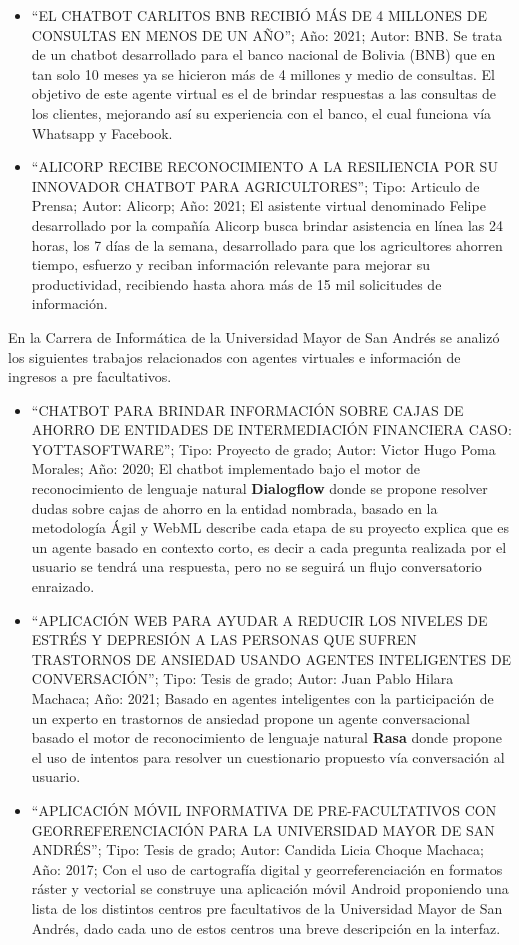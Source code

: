 \documentclass[letter, openright, 12pt]{book}
\begin{document}
\begin{itemize}
\item “EL CHATBOT CARLITOS BNB RECIBIÓ MÁS DE 4 MILLONES DE CONSULTAS EN MENOS DE UN AÑO”; Año: 2021; Autor: BNB. Se trata de un chatbot desarrollado para el banco nacional de Bolivia (BNB) que en tan solo 10 meses ya se hicieron más de 4 millones y medio de consultas. El objetivo de este agente virtual es el de brindar respuestas a las consultas de los clientes, mejorando así su experiencia con el banco, el cual funciona vía Whatsapp y Facebook. 
\item “ALICORP RECIBE RECONOCIMIENTO A LA RESILIENCIA POR SU INNOVADOR CHATBOT PARA AGRICULTORES”; Tipo: Articulo de Prensa; Autor: Alicorp; Año: 2021; El asistente virtual denominado Felipe desarrollado por la compañía Alicorp busca brindar asistencia en línea las 24 horas, los 7 días de la semana, desarrollado para que los agricultores ahorren tiempo, esfuerzo y reciban información relevante para mejorar su productividad, recibiendo hasta ahora más de 15 mil solicitudes de información. 
\end{itemize}

En la Carrera de Informática de la Universidad Mayor de San Andrés se analizó los siguientes trabajos relacionados con agentes virtuales e información de ingresos a pre facultativos. 

\begin{itemize}
\item “CHATBOT PARA BRINDAR INFORMACIÓN SOBRE CAJAS DE AHORRO DE ENTIDADES DE INTERMEDIACIÓN FINANCIERA CASO: YOTTASOFTWARE”; Tipo: Proyecto de grado; Autor:  Victor Hugo Poma Morales; Año: 2020; El chatbot implementado bajo el motor de reconocimiento de lenguaje natural \textbf{Dialogflow} donde se propone resolver dudas sobre cajas de ahorro en la entidad nombrada, basado en la metodología Ágil y WebML describe cada etapa de su proyecto explica que es un agente basado en contexto corto, es decir a cada pregunta realizada por el usuario se tendrá una respuesta, pero no se seguirá un flujo conversatorio enraizado. 
\item “APLICACIÓN WEB PARA AYUDAR A REDUCIR LOS NIVELES DE ESTRÉS Y DEPRESIÓN A LAS PERSONAS QUE SUFREN TRASTORNOS DE ANSIEDAD USANDO AGENTES INTELIGENTES DE CONVERSACIÓN”; Tipo: Tesis de grado; Autor: Juan Pablo Hilara Machaca; Año: 2021; Basado en agentes inteligentes con la participación de un experto en trastornos de ansiedad propone un agente conversacional basado el motor de reconocimiento de lenguaje natural \textbf{Rasa} donde propone el uso de intentos para resolver un cuestionario propuesto vía conversación al usuario.
\item “APLICACIÓN MÓVIL INFORMATIVA DE PRE-FACULTATIVOS CON GEORREFERENCIACIÓN PARA LA UNIVERSIDAD MAYOR DE SAN ANDRÉS”; Tipo: Tesis de grado; Autor: Candida Licia Choque Machaca; Año: 2017; Con el uso de cartografía digital y georreferenciación en formatos ráster y vectorial se construye una aplicación móvil Android proponiendo una lista de los distintos centros pre facultativos de la Universidad Mayor de San Andrés, dado cada uno de estos centros una breve descripción en la interfaz. 
\end{itemize}
\end{document}
